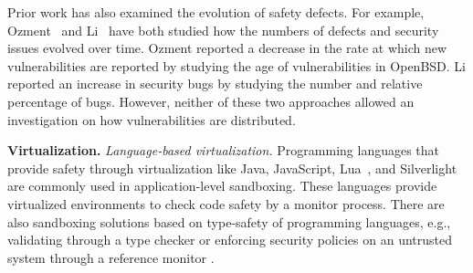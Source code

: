
Prior work has also examined the evolution of safety defects. For example, 
Ozment~\cite{ozment2006milk} and Li~\cite{li2006have} have 
both studied how the numbers of defects and security issues evolved over 
time. Ozment reported a decrease in the rate at which new vulnerabilities 
are reported by studying the age of vulnerabilities in OpenBSD. Li 
reported an increase in security bugs by studying the number and relative 
percentage of bugs. However, neither of these two approaches allowed 
an investigation on how vulnerabilities are distributed. 

\textbf{Virtualization.}
\textit{Language-based virtualization.}
Programming languages that provide safety through virtualization like
Java, JavaScript, Lua~\cite{Lua}, and
Silverlight~\cite{Silverlight} are commonly used in application-level
sandboxing. These languages provide virtualized environments to
check code safety by a monitor process. 
%
There are also sandboxing solutions based on type-safety of programming
languages, e.g., validating through a type checker \cite{JS-Sandboxing}
or enforcing security policies on an untrusted system through a
reference monitor \cite{JS-Sandboxing1}. %

